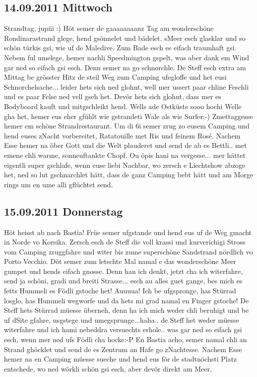 \subsection{14.09.2011 Mittwoch}
Strandtag, jupiii :) Höt semer de gaaaaaaaanz Tag am wonderschöne Rondinarastrand glege, hend gsönnelet und bädelet.
sMeer esch glasklar und so schön türkis gsi, wie uf de Maledive.
Zum Bade esch es eifach traumhaft gsi.
Nebem ful umelege, hemer nachli Speedmington gspelt, was aber dank em Wind gar ned so eifach gsi esch.
Denn semer na go schnorchle.
De Steff esch extra am Mittag be grösster Hitz de steil Weg zum Camping ufegloffe und het eusi Schnorchelsache...
leider hets sich ned glohnt, well mer ussert paar chline Feschli und es paar Felse ned vell gseh het.
Devör hets sich glohnt, dass mer es Bodyboard kauft und mitgschleikt hend.
Wells ade Ostküste sooo hochi Welle gha het, hemer eus eher gfühlt wie gstrandeti Wale als wie Surfer;-)
Zmettaggesse hemer em schöne Strandrestaurant.
Um di 6i semer zrug zo eusem Camping und hend euses zNacht vorbereitet, Ratatouille met Ris und feinem Rosé.
Nachem Esse hemer na öber Gott und die Welt plauderet und send de ab es Bettli..
met emene chli warme, sonneuftankte Chopf.
Ou öpis hani na vergesse...
mer hättet eigentli super gschlafe, wenn euse liebi Nachbar, wo zersch e Liechtshow abzoge het, ned so lut gschnarchlet hätt, dass de ganz Camping bebt hätt und am Morge rings um en ume alli gflüchtet send.

\subsection{15.09.2011 Donnerstag}
Höt heisst ab nach Bastia! Früe semer ufgstande und hend eus uf de Weg gmacht in Norde vo Korsika.
Zersch esch de Steff die voll krassi und kurverichigi Stross vom Camping zruggfahre und witer bis zume superschöne Sandstrand nördlich vo Porto Vecchio.
Döt semer zum letschte Mal namal e das wonderschöne Meer gumpet und hends eifach gnosse.
Denn han ich denkt, jetzt cha ich witerfahre, send ja schöni, gradi und breiti Strasse...
esch au alles guet gange, bes mich es fetts Hummeli es Födli gstoche het! Auuuua! Ich be ufgspronge, has Stürrad losglo, has Hummeli wegworfe und da hets mi grad namal en Finger gstoche! De Steff hets Stürrad müesse überneh, denn ha ich mich weder chli beruhigt und be uf dSite gfahre, usgstege und umegsprunge...haha..
de Steff het weder müesse witerfahre und ich hami nebeddra versuechts erhole..
was gar ned so eifach gsi esch, wenn mer ned ufs Födli cha hocke:-P
En Bastia acho, semer namal chli an Strand ghöcklet und send de es Zentrum an Hafe go zNachtesse.
Nachem Esse hemer na en Camping müesse sueche und hend eus för de stadtnöchsti Platz entschede, wo ned wörkli schön gsi esch, aber devör direkt am Meer.


